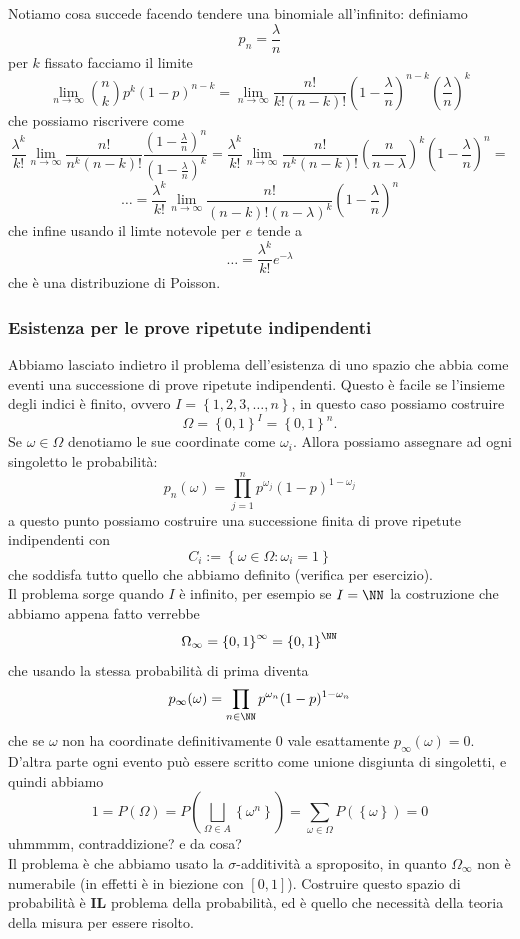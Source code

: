 \documentclass[11pt]{scrartcl}
\begin{document}
	Notiamo cosa succede facendo tendere una binomiale all'infinito: definiamo 
	$$p_n=\frac{\lambda}{n}$$
	per $k$ fissato facciamo il limite
	$$\lim_{n\to\infty}\binom{n}{k}p^k(1-p)^{n-k}=\lim_{n\to\infty}\frac{n!}{k!(n-k)!}\left(1-\frac{\lambda}{n}\right)^{n-k}\left(\frac{\lambda}{n}\right)^k$$
	che possiamo riscrivere come
	$$\frac{\lambda^k}{k!}\lim_{n\to\infty}\frac{n!}{n^k(n-k)!}\frac{\left(1-\frac{\lambda}{n}\right)^n}{\left(1-\frac{\lambda}{n}\right)^k}=\frac{\lambda^k}{k!}\lim_{n\to\infty}\frac{n!}{n^k(n-k)!}\left(\frac{n}{n-\lambda}\right)^k\left(1-\frac{\lambda}{n}\right)^n=$$
	$$\dots = \frac{\lambda^k}{k!}\lim_{n\to\infty}\frac{n!}{(n-k)!(n-\lambda)^k}\left(1-\frac{\lambda}{n}\right)^n$$
	che infine usando il limte notevole per $e$ tende a 
	$$\dots = \frac{\lambda^k}{k!}e^{-\lambda}$$
	che è una distribuzione di Poisson.
	\subsubsection{Esistenza per le prove ripetute indipendenti}
	
	Abbiamo lasciato indietro il problema dell'esistenza di uno spazio che abbia come eventi una successione di prove ripetute indipendenti. Questo è facile se l'insieme degli indici è finito, ovvero $I=\left\{1,2,3,\dots,n\right\}$, in questo caso possiamo costruire
	$$\Omega=\left\{0,1\right\}^I=\left\{0,1\right\}^n.$$
	Se $\omega\in \Omega$ denotiamo le sue coordinate come $\omega_i$. Allora possiamo  assegnare ad ogni singoletto le probabilità:
	$$p_n(\omega)=\prod_{j=1}^n p^{\omega_j}(1-p)^{1-\omega_j}$$
	a questo punto possiamo costruire una successione finita di prove ripetute indipendenti con
	$$C_i:=\left\{\omega\in \Omega:\omega_i=1\right\}$$
	che soddisfa tutto quello che abbiamo definito (verifica per esercizio). \\
	Il problema sorge quando $I$ è infinito, per esempio se $I=\NN$ la costruzione che abbiamo appena fatto verrebbe
	$$\Omega_\infty=\left\{0,1\right\}^\infty=\left\{0,1\right\}^\NN$$
	che usando la stessa probabilità di prima diventa
	$$p_\infty (\omega)=\prod_{n\in\NN}p^{\omega_n}(1-p)^{1-\omega_n}$$
	che se $\omega$ non ha coordinate definitivamente $0$ vale esattamente $p_\infty(\omega)=0$. D'altra parte ogni evento può essere scritto come unione disgiunta di singoletti, e quindi abbiamo
	$$1=P(\Omega)=P\left(\bigsqcup_{\Omega\in A}\left\{\omega^n\right\}\right)=\sum_{\omega\in \Omega}P(\left\{\omega\right\})=0$$
	uhmmmm, contraddizione? e da cosa? \\
	Il problema è che abbiamo usato la $\sigma$-additività a sproposito, in quanto $\Omega_\infty$ non è numerabile (in effetti è in biezione con $[0,1]$). Costruire questo spazio di probabilità è \textbf{IL} problema della probabilità, ed è quello che necessità della teoria della misura per essere risolto.
	
\end{document}
